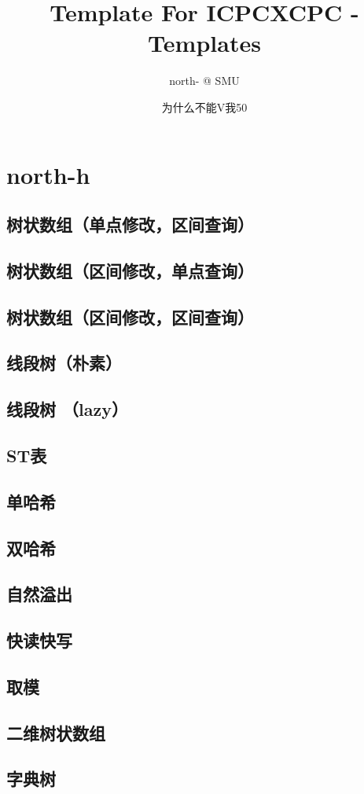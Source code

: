 \documentclass[10pt,a4paper]{article}
\title{Template For ICPC}
\author{north- @ SMU}
\begin{document}
\title{XCPC - Templates}
\author {为什么不能V我50}
\date{}
\maketitle
\tableofcontents
\newpage
\section{north-h}
\subsection{树状数组（单点修改，区间查询）}

\subsection{树状数组（区间修改，单点查询）}

\subsection{树状数组（区间修改，区间查询）}

\subsection{线段树（朴素）}

\subsection{线段树 （lazy）}

\subsection{ST表}

\subsection{单哈希}

\subsection{双哈希}

\subsection{自然溢出}

\subsection{快读快写}

\subsection{取模}

\subsection{二维树状数组}

\subsection{字典树}

\end{document}
